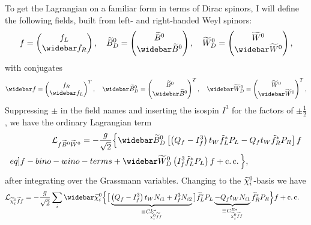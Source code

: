 \documentclass[english, notitlepage]{article}
\begin{document}
                To get the Lagrangian on a familiar form in terms of Dirac spinors, I will define the following fields, built from left- and right-handed Weyl spinors:
                \begin{align}
                    f = \begin{pmatrix}
                        f_L \\ \wbar{f}_R
                    \end{pmatrix},\quad \wtilde{B}^0_D = \begin{pmatrix}
                        \wtilde{B}^0 \\ \wbar{\wtilde{B}}^0
                    \end{pmatrix},\quad \wtilde{W}^0_D = \begin{pmatrix}
                        \wtilde{W}^0 \\ \wbar{\wtilde{W}}^0
                    \end{pmatrix},
                \end{align}
                with conjugates
                \begin{align}
                    \wbar{f} = \begin{pmatrix}
                        f_R \\ \wbar{f}_L
                    \end{pmatrix}^T,\quad \wbar{\wtilde{B}}^0_D = \begin{pmatrix}
                        \wtilde{B}^0 \\ \wbar{\wtilde{B}}^0
                    \end{pmatrix}^T,\quad \wbar{\wtilde{W}}^0_D = \begin{pmatrix}
                        \wtilde{W}^0 \\ \wbar{\wtilde{W}}^0
                    \end{pmatrix}^T,
                \end{align}
                Suppressing $\pm$ in the field names and inserting the isospin $I^3$ for the factors of $\pm\frac{1}{2}$, we have the ordinary Lagrangian term
                \begin{align} \nonumber
                    \L_{f\bino\wino} = -\frac{g}{\sqrt{2}} &\Big\{ \wbar{\wtilde{B}}^0_D \bclosed{ \pclosed{Q_f - I^3_f}t_W \tilde{f}_L^* P_L - Q_f t_W \tilde{f}_R^* P_R } f \\ \label[eq]{f-bino-wino-terms}
                    &+ \wbar{\wtilde{W}}^0_D \pclosed{I^3_f \tilde{f}_L^* P_L} f + \cc \Big\},
                \end{align}
                after integrating over the Grassmann variables.
                Changing to the $\nino[i]$-basis we have
                \begin{align} \label{eq:nino-sf-f-terms}
                    \L_{\nino[i]\wtilde{f}f} = -\frac{g}{\sqrt{2}} \sum_{i} \wbar{\wtilde{\chi}}^0_i &\Big\{ \big[ \underbrace{\pclosed{Q_f - I^3_f}t_W N_{i1}  + I^3_f N_{i2}}_{\equiv C_{\nino[i] \wtilde{f} f}^{L*}} \big] \wtilde{f}_L^* P_L \underbrace{- Q_f t_W N_{i1}}_{\equiv C_{\nino[i] \wtilde{f} f}^{R*}} \wtilde{f}_R^* P_R \Big\} f + \cc
                \end{align}
\end{document}
